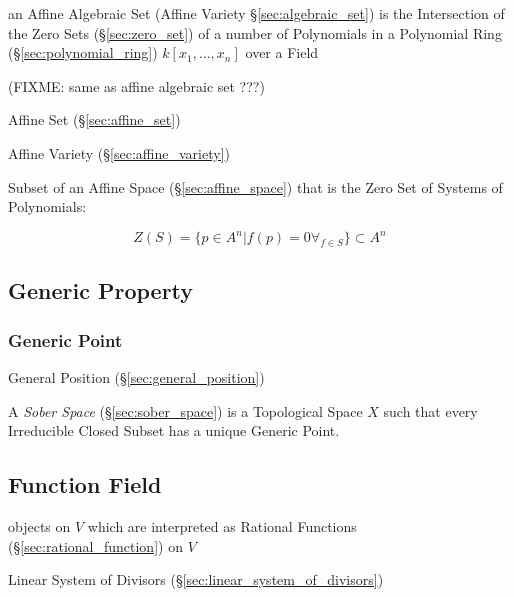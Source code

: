 an Affine Algebraic Set (Affine Variety \S\ref{sec:algebraic_set}) is the
Intersection of the Zero Sets (\S\ref{sec:zero_set}) of a number of Polynomials
in a Polynomial Ring (\S\ref{sec:polynomial_ring}) $k[x_1,\ldots,x_n]$ over a
Field

(FIXME: same as affine algebraic set ???)


Affine Set (\S\ref{sec:affine_set})

Affine Variety (\S\ref{sec:affine_variety})

Subset of an Affine Space (\S\ref{sec:affine_space}) that is the Zero Set of
Systems of Polynomials:

\[
  Z(S) = \{ p \in A^n | f(p) = 0 \forall_{f \in S} \} \subset A^n
\]



\subsection{Generic Property}\label{sec:generic_property}

\subsubsection{Generic Point}\label{sec:generic_point}

\fist General Position (\S\ref{sec:general_position})

\fist A \emph{Sober Space} (\S\ref{sec:sober_space}) is a Topological Space $X$
such that every Irreducible Closed Subset has a unique Generic Point.



\subsection{Function Field}\label{sec:function_field}

objects on $V$ which are interpreted as Rational Functions
(\S\ref{sec:rational_function}) on $V$

\fist Linear System of Divisors (\S\ref{sec:linear_system_of_divisors})




